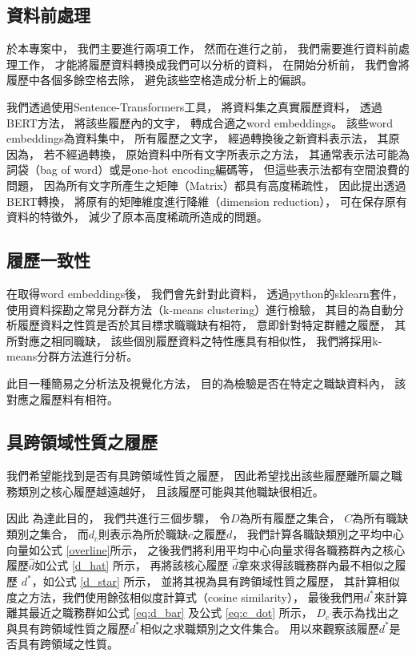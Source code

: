\documentclass[sigconf]{acmart}
\begin{document}
\subsection{資料前處理}

於本專案中，
我們主要進行兩項工作，
然而在進行之前，
我們需要進行資料前處理工作，
才能將履歷資料轉換成我們可以分析的資料，
在開始分析前，
我們會將履歷中各個多餘空格去除，
避免該些空格造成分析上的偏誤。

我們透過使用Sentence-Transformers\cite{reimers-2020-multilingual-sentence-bert}工具，
將資料集之真實履歷資料，
透過BERT方法\cite{devlin2018bert}，
將該些履歷內的文字，
轉成合適之word embeddings。
該些word embeddings為資料集中，
所有履歷之文字，
經過轉換後之新資料表示法，
其原因為，
若不經過轉換，
原始資料中所有文字所表示之方法，
其通常表示法可能為詞袋（bag of word）或是one-hot encoding編碼等，
但這些表示法都有空間浪費的問題，
因為所有文字所產生之矩陣（Matrix）都具有高度稀疏性\cite{schutze2008introduction}，
因此提出透過BERT轉換\cite{devlin2018bert}，
將原有的矩陣維度進行降維（dimension reduction），
可在保存原有資料的特徵外，
減少了原本高度稀疏所造成的問題。

\subsection{履歷一致性}

在取得word embeddings後，
我們會先針對此資料，
透過python的sklearn\cite{sklearn_api}套件，
使用資料探勘之常見分群方法（k-means clustering）進行檢驗\cite{han2011data}，
其目的為自動分析履歷資料之性質是否於其目標求職職缺有相符，
意即針對特定群體之履歷，
其所對應之相同職缺，
該些個別履歷資料之特性應具有相似性，
我們將採用k-means分群方法\cite{macqueen1967some}進行分析。

此目一種簡易之分析法及視覺化方法，
目的為檢驗是否在特定之職缺資料內，
該對應之履歷料有相符。


\subsection{具跨領域性質之履歷}

我們希望能找到是否有具跨領域性質之履歷，
因此希望找出該些履歷離所屬之職務類別之核心履歷越遠越好，
且該履歷可能與其他職缺很相近。

因此
為達此目的，
我們共進行三個步驟，
令$D$為所有履歷之集合，
$C$為所有職缺類別之集合，
而$d_{c}$則表示為所於職缺$c$之履歷$d$，
我們計算各職缺類別之平均中心向量如公式 \ref{overline}所示，
之後我們將利用平均中心向量求得各職務群內之核心履歷$\hat{d}$如公式 \ref{d_hat} 所示，
再將該核心履歷 $\hat{d}$拿來求得該職務群內最不相似之履歷 $d^{*}$，如公式 \ref{d_star} 所示，
並將其視為具有跨領域性質之履歷，
其計算相似度之方法，我們使用餘弦相似度計算式（cosine similarity）\cite{schutze2008introduction}，
最後我們用$d^{*}$來計算離其最近之職務群如公式 \ref{eq:d_bar} 及公式 \ref{eq:c_dot} 所示，
$D_{c^{'}}$表示為找出之與具有跨領域性質之履歷$d^{*}$相似之求職類別之文件集合。
用以來觀察該履歷$d^{*}$是否具有跨領域之性質。
\end{document}
